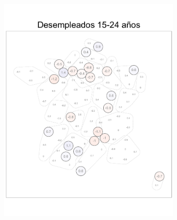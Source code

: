 \begin{figure}
	\centering
	\begin{subfigure}{0.275\textwidth}
	\includegraphics[width = \textwidth]{Figs/Efectos/Dorling_Efectos_Des1_Modelo_H}
	\end{subfigure}
	~
	\begin{subfigure}{0.275\textwidth}

\end{subfigure}
\end{figure}
